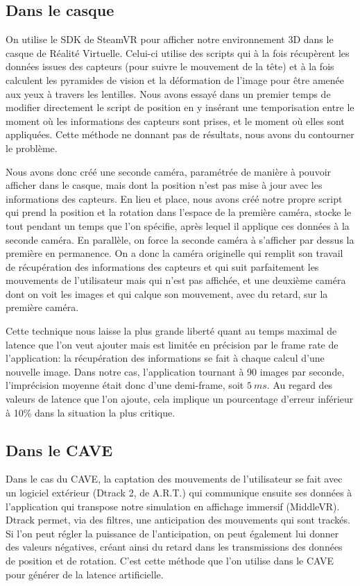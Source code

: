 	\subsection{Dans le casque}
	\par On utilise le SDK de SteamVR pour afficher notre environnement 3D dans le casque de Réalité Virtuelle. Celui-ci utilise des scripts qui à la fois récupèrent les données issues des capteurs (pour suivre le mouvement de la tête) et à la fois calculent les pyramides de vision et la déformation de l'image pour être amenée aux yeux à travers les lentilles. Nous avons essayé dans un premier temps de modifier directement le script de position en y insérant une temporisation entre le moment où les informations des capteurs sont prises, et le moment où elles sont appliquées. Cette méthode ne donnant pas de résultats, nous avons du contourner le problème.
	
	\par Nous avons donc créé une seconde caméra, paramétrée de manière à pouvoir afficher dans le casque, mais dont la position n'est pas mise à jour avec les informations des capteurs. En lieu et place, nous avons créé notre propre script qui prend la position et la rotation dans l'espace de la première caméra, stocke le tout pendant un temps que l'on spécifie, après lequel il applique ces données à la seconde caméra. En parallèle, on force la seconde caméra à s'afficher par dessus la première en permanence. On a donc la caméra originelle qui remplit son travail de récupération des informations des capteurs et qui suit parfaitement les mouvements de l'utilisateur mais qui n'est pas affichée, et une deuxième caméra dont on voit les images et qui calque son mouvement, avec du retard, sur la première caméra.
	
	\par Cette technique nous laisse la plus grande liberté quant au temps maximal de latence que l'on veut ajouter mais est limitée en précision par le frame rate de l'application: la récupération des informations se fait à chaque calcul d'une nouvelle image. Dans notre cas, l'application tournant à 90 images par seconde, l'imprécision moyenne était donc d'une demi-frame, soit $5~ms$. Au regard des valeurs de latence que l'on ajoute, cela implique un pourcentage d'erreur inférieur à 10\% dans la situation la plus critique.
	
	\subsection{Dans le CAVE}	
	\par Dans le cas du CAVE, la captation des mouvements de l'utilisateur se fait avec un logiciel extérieur (Dtrack 2, de A.R.T.) qui communique ensuite ses données à l'application qui transpose notre simulation en affichage immersif (MiddleVR). Dtrack permet, via des filtres, une anticipation des mouvements qui sont trackés. Si l'on peut régler la puissance de l'anticipation, on peut également lui donner des valeurs négatives, créant ainsi du retard dans les transmissions des données de position et de rotation. C'est cette méthode que l'on utilise dans le CAVE pour générer de la latence artificielle.
	
